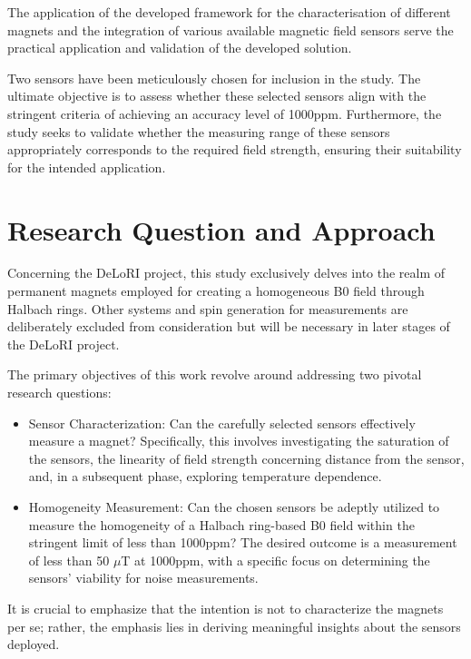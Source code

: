 The application of the developed framework for the characterisation of
different magnets and the integration of various available magnetic
field sensors serve the practical application and validation of the
developed solution.

Two sensors have been meticulously chosen for inclusion in the study.
The ultimate objective is to assess whether these selected sensors align
with the stringent criteria of achieving an accuracy level of
1000\gls{ppm}. Furthermore, the study seeks to validate whether the
measuring range of these sensors appropriately corresponds to the
required field strength, ensuring their suitability for the intended
application.

\hypertarget{research-question-and-approach}{%
\section{Research Question and
Approach}\label{research-question-and-approach}}

Concerning the DeLoRI project, this study exclusively delves into the
realm of permanent magnets employed for creating a homogeneous B0 field
through Halbach rings. Other systems and spin generation for
measurements are deliberately excluded from consideration but will be
necessary in later stages of the DeLoRI project.

The primary objectives of this work revolve around addressing two
pivotal research questions:

\begin{itemize}
\item
  Sensor Characterization: Can the carefully selected sensors
  effectively measure a magnet? Specifically, this involves
  investigating the saturation of the sensors, the linearity of field
  strength concerning distance from the sensor, and, in a subsequent
  phase, exploring temperature dependence.
\item
  Homogeneity Measurement: Can the chosen sensors be adeptly utilized to
  measure the homogeneity of a Halbach ring-based B0 field within the
  stringent limit of less than 1000\gls{ppm}? The desired outcome is a
  measurement of less than 50 \(\mu\)T at 1000\gls{ppm}, with a specific
  focus on determining the sensors' viability for noise measurements.
\end{itemize}

It is crucial to emphasize that the intention is not to characterize the
magnets per se; rather, the emphasis lies in deriving meaningful
insights about the sensors deployed.

